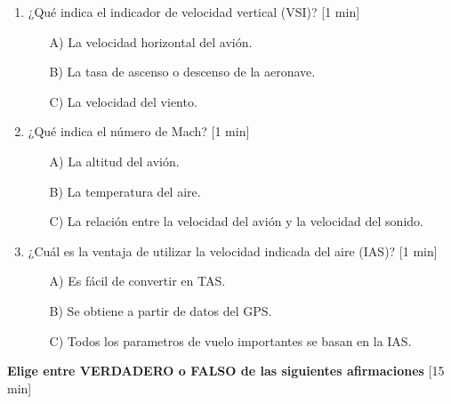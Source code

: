 \begin{enumerate}
\item  ¿Qué indica el indicador de velocidad vertical (VSI)? [1 min]
    \begin{itemize}
    \item[A)] La velocidad horizontal del avión.
    \item[B)] La tasa de ascenso o descenso de la aeronave.
    \item[C)] La velocidad del viento.\\
    \end{itemize}

\item ¿Qué indica el número de Mach? [1 min]
    \begin{itemize}
    \item[A)] La altitud del avión. 
    \item[B)] La temperatura del aire.
    \item[C)] La relación entre la velocidad del avión y la velocidad del sonido.\\
    \end{itemize}

\item  ¿Cuál es la ventaja de utilizar la velocidad indicada del aire (IAS)? [1 min]
    \begin{itemize}
    \item[A)] Es fácil de convertir en TAS.
    \item[B)] Se obtiene a partir de datos del GPS.
    \item[C)] Todos los parametros de vuelo importantes se basan en la IAS.\\
    \end{itemize}
\end{enumerate}



\begin{nosangria}
\Large{\textbf{Elige entre VERDADERO o FALSO de las siguientes afirmaciones} [15 min]}
\end{nosangria}

